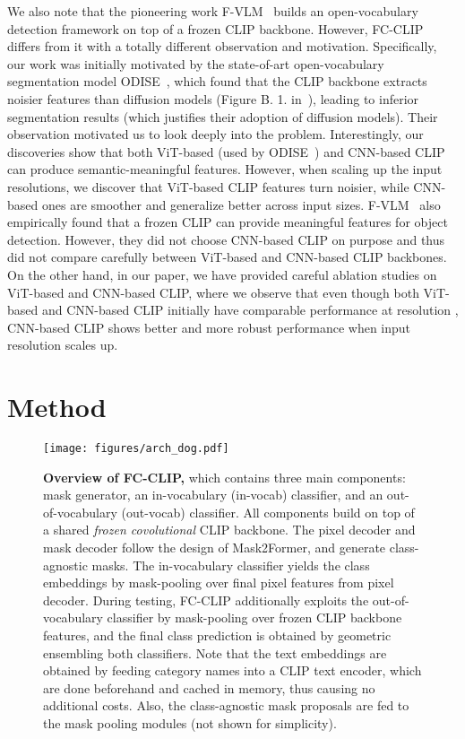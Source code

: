 \documentclass{article}
\newcommand{\modelname}{FC-CLIP\xspace}
\begin{document}
We also note that the pioneering work F-VLM~\cite{kuo2022f} builds an open-vocabulary detection framework on top of a frozen CLIP backbone. However, \modelname differs from it with a totally different observation and motivation. Specifically, our work was initially motivated by the state-of-art open-vocabulary segmentation model ODISE~\cite{xu2023open}, which found that the CLIP backbone extracts noisier features than diffusion models (Figure B. 1. in~\cite{xu2023open}), leading to inferior segmentation results (which justifies their adoption of diffusion models). Their observation motivated us to look deeply into the problem. Interestingly, our discoveries show that both ViT-based (used by ODISE~\cite{xu2023open}) and CNN-based CLIP can produce semantic-meaningful features. However, when scaling up the input resolutions, we discover that ViT-based CLIP features turn noisier, while CNN-based ones are smoother and generalize better across input sizes. F-VLM~\cite{kuo2022f} also empirically found that a frozen CLIP can provide meaningful features for object detection. However, they did not choose CNN-based CLIP on purpose and thus did not compare carefully between ViT-based and CNN-based CLIP backbones. On the other hand, in our paper, we have provided careful ablation studies on ViT-based and CNN-based CLIP, where we observe that even though both ViT-based and CNN-based CLIP initially have comparable performance at resolution , CNN-based CLIP shows better and more robust performance when input resolution scales up. \section{Method}
\label{Method}

\begin{figure}
    \centering
    \texttt{[image: figures/arch\_dog.pdf]}
    \caption{
    \textbf{Overview of \modelname,} which contains three main components: mask generator, an in-vocabulary (in-vocab) classifier, and an out-of-vocabulary (out-vocab) classifier.
    All components build on top of a shared \textit{frozen covolutional} CLIP backbone.
    The pixel decoder and mask decoder follow the design of Mask2Former, and generate class-agnostic masks.
    The in-vocabulary classifier yields the class embeddings by mask-pooling over final pixel features from pixel decoder.
    During testing, \modelname additionally exploits the out-of-vocabulary classifier by mask-pooling over frozen CLIP backbone features, and the final class prediction is obtained by geometric ensembling both classifiers.    
    Note that the text embeddings are obtained by feeding category names into a CLIP text encoder, which are done beforehand and cached in memory, thus causing no additional costs.
    Also, the class-agnostic mask proposals are fed to the mask pooling modules (not shown for simplicity).
    }
\label{fig:model_arch}
\end{figure}
\end{document}
